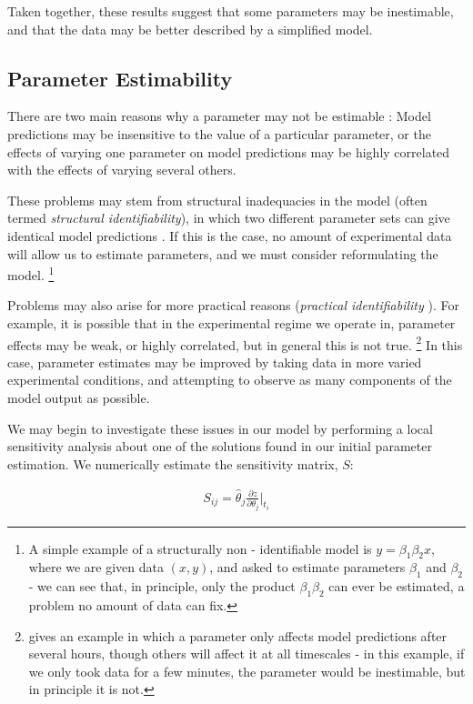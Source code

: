\documentclass[10pt,journal]{./IEEE_latex_class/IEEEtran}
\begin{document}
 Taken together, these results suggest that some parameters may be inestimable, and that the data may be better described by a simplified model.  
 
 \subsection{Parameter Estimability}
\label{Parameter Estimability}
 
 There are two main reasons why a parameter may not be estimable \cite{Mclean2012,Yao2003, Beck}: Model predictions may be insensitive to the value of a particular parameter, or the effects of varying one parameter on model predictions may be highly correlated with the effects of varying several others.
 
These problems may stem from structural inadequacies in the model (often termed \textit{structural identifiability}), in which two different parameter sets can give identical model predictions \cite{Jimenez-Hornero2008,Grewal1976 }. If this is the case, no amount of experimental data will allow us to estimate parameters, and we must consider reformulating the model. \footnote{A simple example of a structurally non - identifiable model is $y = \beta_{1}\beta_{2}x$, where we are given data $(x,y)$, and asked to estimate parameters $\beta_{1}$ and $\beta_{2}$ - we can see that, in principle, only the product $\beta_{1}\beta_{2}$ can ever be estimated, a problem no amount of data can fix.}

Problems may also arise for more practical reasons (\textit{practical identifiability} \cite{Mclean2012}). For example, it is possible that in the experimental regime we operate in, parameter effects may be weak, or highly correlated, but in general this is not true. \footnote{\cite{Beck} gives an example in which a parameter only affects model predictions after several hours, though others will affect it at all timescales - in this example, if we only took data for a few minutes, the parameter would be inestimable, but in principle it is not.} In this case, parameter estimates may be improved by taking data in more varied experimental conditions, and attempting to observe as many components of the model output as possible. 
 
 We may begin to investigate these issues in our model by performing a local sensitivity analysis about one of the solutions found in our initial parameter estimation. We numerically estimate the sensitivity matrix, $S$:
 
 \begin{align}
S_{ij} = \hat{\theta}_{j} \frac{\partial z}{ \partial \theta_{j}}\Bigr|_{t_{i}}
\end{align}
\end{document}
